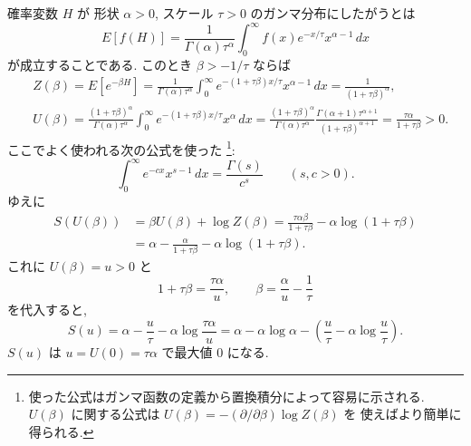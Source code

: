 \documentclass[12pt,twoside]{jarticle}
\renewcommand\d{\partial}
\theoremstyle{definition} %
\theoremstyle{definition} %
\theoremstyle{definition} %
\numberwithin{theorem}{section}
\numberwithin{equation}{section}
\numberwithin{figure}{section}
\numberwithin{table}{section}
\begin{document}
確率変数 $H$ が
形状 $\alpha>0$, スケール $\tau>0$ のガンマ分布にしたがうとは
\[
E[f(H)]=
\frac{1}{\Gamma(\alpha)\tau^\alpha}
\int_0^\infty f(x)e^{-x/\tau}x^{\alpha-1}\,dx
\]
が成立することである. このとき $\beta>-1/\tau$ ならば
\begin{align*}
&
Z(\beta)=E[e^{-\beta H}]
=\frac{1}{\Gamma(\alpha)\tau^\alpha}
\int_0^\infty e^{-(1+\tau\beta)x/\tau}x^{\alpha-1}\,dx
=\frac{1}{(1+\tau\beta)^\alpha},
\\ &
U(\beta)
=
\frac{(1+\tau\beta)^\alpha}{\Gamma(\alpha)\tau^\alpha}
\int_0^\infty e^{-(1+\tau\beta)x/\tau}x^\alpha \,dx
=
\frac{(1+\tau\beta)^\alpha}{\Gamma(\alpha)\tau^\alpha}
\frac{\Gamma(\alpha+1)\tau^{\alpha+1}}{(1+\tau\beta)^{\alpha+1}}
=
\frac{\tau\alpha}{1+\tau\beta}>0.
\end{align*}
ここでよく使われる次の公式を使った%
\footnote{使った公式はガンマ函数の定義から置換積分によって容易に示される.
$U(\beta)$ に関する公式は $U(\beta)=-(\d/\d\beta)\log Z(\beta)$ を
使えばより簡単に得られる.}:
\[
\int_0^\infty e^{-c x}x^{s-1}\,dx = \frac{\Gamma(s)}{c^s}
\qquad (s,c>0).
\]
ゆえに
\begin{align*}
S(U(\beta))
&
=\beta U(\beta)+\log Z(\beta)
=\frac{\tau\alpha\beta}{1+\tau\beta}
-\alpha\log(1+\tau\beta)
\\ &
=\alpha - \frac{\alpha}{1+\tau\beta}-\alpha\log(1+\tau\beta).
\end{align*}
これに $U(\beta)=u>0$ と
\[
1+\tau\beta = \frac{\tau\alpha}{u}, \qquad
\beta=\frac{\alpha}{u}-\frac{1}{\tau}
\]
を代入すると,
\[
S(u)
= \alpha-\frac{u}{\tau}-\alpha\log\frac{\tau\alpha}{u}
= \alpha-\alpha\log\alpha -\left(\frac{u}{\tau}-\alpha\log\frac{u}{\tau}\right).
\]
$S(u)$ は $u=U(0)=\tau\alpha$ で最大値 $0$ になる.
\end{document}
